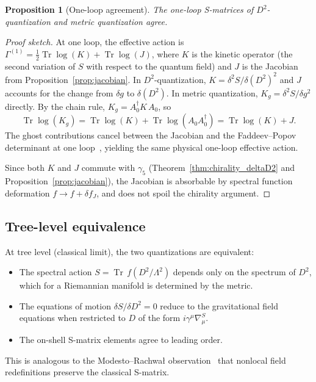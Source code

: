 \documentclass[12pt,a4paper]{article}
\newtheorem{proposition}[theorem]{Proposition}
\theoremstyle{definition}
\theoremstyle{remark}
\newcommand{\Tr}{\operatorname{Tr}}
\newcommand{\half}{\tfrac{1}{2}}
\newcommand{\Lam}{\Lambda}
\begin{document}
\begin{proposition}[One-loop agreement]
\label{prop:oneloop}
The one-loop S-matrices of $D^2$-quantization and metric quantization agree.
\end{proposition}

\begin{proof}[Proof sketch]
At one loop, the effective action is
$\Gamma^{(1)} = \half\Tr\log(K) + \Tr\log(J)$,
where $K$ is the kinetic operator (the second variation of $S$ with respect to
the quantum field) and $J$ is the Jacobian from Proposition~\ref{prop:jacobian}.
In $D^2$-quantization, $K = \delta^2 S / \delta(D^2)^2$ and $J$ accounts for
the change from $\delta g$ to $\delta(D^2)$.  In metric quantization,
$K_g = \delta^2 S / \delta g^2$ directly.  By the chain rule,
$K_g = A_0^\dagger K\, A_0$, so
\begin{equation}
  \Tr\log(K_g) = \Tr\log(K) + \Tr\log(A_0 A_0^\dagger) = \Tr\log(K) + J.
\end{equation}
The ghost contributions cancel between the Jacobian and the Faddeev--Popov
determinant at one loop~\cite{Bastianelli:2006rx}, yielding the same physical
one-loop effective action.

Since both $K$ and $J$ commute with $\gamma_5$
(Theorem~\ref{thm:chirality_deltaD2} and
Proposition~\ref{prop:jacobian}), the Jacobian is absorbable by spectral
function deformation $f \to f + \delta f_J$, and does not spoil the chirality
argument.
\end{proof}

\subsection{Tree-level equivalence}

At tree level (classical limit), the two quantizations are equivalent:
\begin{itemize}
  \item The spectral action $S = \Tr\,f(D^2/\Lam^2)$ depends only on the
        spectrum of $D^2$, which for a Riemannian manifold is determined by the
        metric.
  \item The equations of motion $\delta S / \delta D^2 = 0$ reduce to the
        gravitational field equations when restricted to $D$ of the
        form $i\gamma^\mu\nabla_\mu^S$.
  \item The on-shell S-matrix elements agree to leading order.
\end{itemize}

This is analogous to the Modesto--Rachwa\l{}
observation~\cite{Modesto:2017sdr} that nonlocal field redefinitions preserve
the classical S-matrix.
\end{document}
